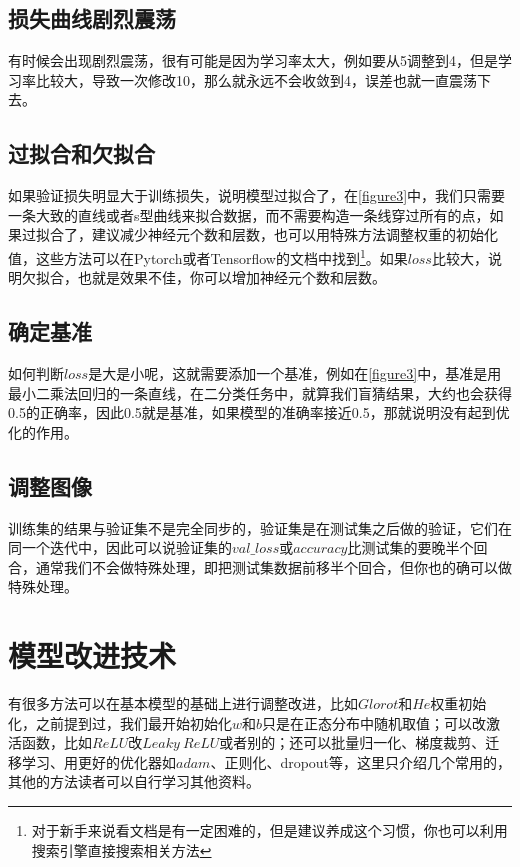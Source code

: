 \documentclass[a5paper, 11pt, openany]{book}
\begin{document}
\section{损失曲线剧烈震荡}
有时候会出现剧烈震荡，很有可能是因为学习率太大，例如要从5调整到4，但是学习率比较大，导致一次修改10，那么就永远不会收敛到4，误差也就一直震荡下去。

\section{过拟合和欠拟合}
如果验证损失明显大于训练损失，说明模型过拟合了，在\ref{figure3}中，我们只需要一条大致的直线或者s型曲线来拟合数据，而不需要构造一条线穿过所有的点，如果过拟合了，建议减少神经元个数和层数，也可以用特殊方法调整权重的初始化值，这些方法可以在Pytorch或者Tensorflow的文档中找到\footnote{对于新手来说看文档是有一定困难的，但是建议养成这个习惯，你也可以利用搜索引擎直接搜索相关方法}。如果$loss$比较大，说明欠拟合，也就是效果不佳，你可以增加神经元个数和层数。

\section{确定基准}
如何判断$loss$是大是小呢，这就需要添加一个基准，例如在\ref{figure3}中，基准是用最小二乘法回归的一条直线，在二分类任务中，就算我们盲猜结果，大约也会获得0.5的正确率，因此0.5就是基准，如果模型的准确率接近0.5，那就说明没有起到优化的作用。

\section{调整图像}

训练集的结果与验证集不是完全同步的，验证集是在测试集之后做的验证，它们在同一个迭代中，因此可以说验证集的$val\_loss$或$accuracy$比测试集的要晚半个回合，通常我们不会做特殊处理，即把测试集数据前移半个回合，但你也的确可以做特殊处理。




\chapter{模型改进技术}

有很多方法可以在基本模型的基础上进行调整改进，比如$Glorot$和$He$权重初始化，之前提到过，我们最开始初始化$w$和$b$只是在正态分布中随机取值；可以改激活函数，比如$ReLU$改$Leaky~ReLU$或者别的；还可以批量归一化、梯度裁剪、迁移学习、用更好的优化器如$adam$、正则化、dropout等，这里只介绍几个常用的，其他的方法读者可以自行学习其他资料。
\end{document}
